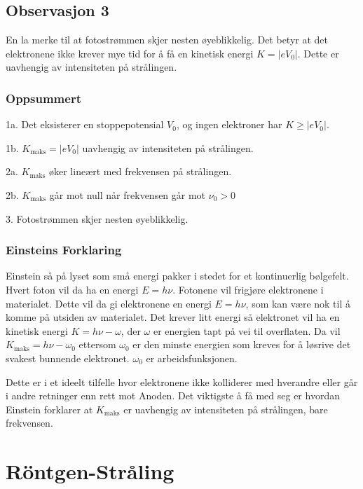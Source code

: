 \subsection{Observasjon 3}
En la merke til at fotostrømmen skjer nesten øyeblikkelig. Det betyr at det elektronene ikke krever mye tid for å få en kinetisk energi $K = \left\vert eV_0 \right\vert $. Dette er uavhengig av intensiteten på strålingen.

\subsubsection{Oppsummert}
  1a. Det eksisterer en stoppepotensial $V_0$, og ingen elektroner har $K \ge  \left\vert eV_0 \right\vert $. 
  
  1b. $K_{\text{maks}} = \left\vert e V_0 \right\vert $ uavhengig av intensiteten på strålingen.
  
  2a. $K_{\text{maks}}$ øker lineært med frekvensen på strålingen.
  
  2b. $K_{\text{maks}}$ går mot null når frekvensen går mot $ν_0 > 0$
  
  3. Fotostrømmen skjer nesten øyeblikkelig.

\subsubsection{Einsteins Forklaring}
Einstein så på lyset som små energi pakker i stedet for et kontinuerlig bølgefelt. Hvert foton vil da ha en energi $E = hν$. Fotonene vil frigjøre elektronene i materialet. Dette vil da gi elektronene en energi $E = hν$, som kan være nok til å komme på utsiden av materialet. Det krever litt energi så elektronet vil ha en kinetisk energi $K = hν - ω$, der $ω$ er energien tapt på vei til overflaten. Da vil $K_{\text{maks}} = hν - ω_0$ ettersom $ω_0$ er den minste energien som kreves for å løsrive det svakest bunnende elektronet. $ω_0$ er arbeidsfunksjonen. 

Dette er i et ideelt tilfelle hvor elektronene ikke kolliderer med hverandre eller går i andre retninger enn rett mot Anoden. Det viktigste å få med seg er hvordan Einstein forklarer at $K_{\text{maks}}$ er uavhengig av intensiteten på strålingen, bare frekvensen. 


\section{Röntgen-Stråling}

